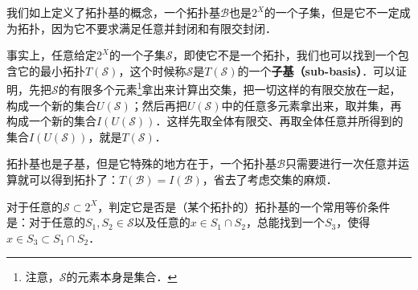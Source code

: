 我们如上定义了拓扑基的概念，一个拓扑基$\mathcal{B}$也是$2^X$的一个子集，但是它不一定成为拓扑，因为它不要求满足任意并封闭和有限交封闭．

事实上，任意给定$2^X$的一个子集$\mathcal{S}$，即使它不是一个拓扑，我们也可以找到一个包含它的最小拓扑$T(\mathcal{S})$，这个时候称$\mathcal{S}$是$T(\mathcal{S})$的一个\textbf{子基（sub-basis）}．可以证明，先把$\mathcal{S}$的有限多个元素\footnote{注意，$\mathcal{S}$的元素本身是集合．}拿出来计算出交集，把一切这样的有限交放在一起，构成一个新的集合$U(\mathcal{S})$；然后再把$U(\mathcal{S})$中的任意多元素拿出来，取并集，再构成一个新的集合$I(U(\mathcal{S}))$．这样先取全体有限交、再取全体任意并所得到的集合$I(U(\mathcal{S}))$，就是$T(\mathcal{S})$．

拓扑基也是子基，但是它特殊的地方在于，一个拓扑基$\mathcal{B}$只需要进行一次任意并运算就可以得到拓扑了：$T(\mathcal{B})=I(\mathcal{B})$，省去了考虑交集的麻烦．

对于任意的$\mathcal{S}\subset2^X$，判定它是否是（某个拓扑的）拓扑基的一个常用等价条件是：对于任意的$S_1, S_2\in \mathcal{S}$以及任意的$x\in S_1\cap S_2$，总能找到一个$S_3$，使得$x\in S_3\subset S_1\cap S_2$．
